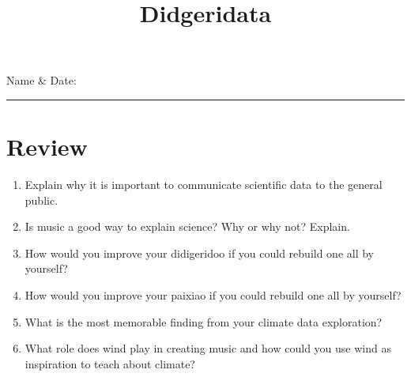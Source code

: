 \documentclass[letterpaper,12pt]{scrartcl}
\title{
Didgeridata
}\let\myTitle\@title
\begin{document}
\thispagestyle{fancy}
\noindent Name \& Date:\\ %
\rule{\textwidth}{1pt}    %

\section*{Review}
\begin{enumerate} 
	\item Explain why it is important to communicate scientific data to the general public. \vspace{30mm}
	\item Is music a good way to explain science? Why or why not? Explain. \vspace{30mm}
	\item How would you improve your didigeridoo if you could rebuild one all by yourself? \vspace{10mm}
	\item How would you improve your paixiao if you could rebuild one all by yourself? \vspace{10mm}
	\item What is the most memorable finding from your climate data exploration? \vspace{30mm}
	\item What role does wind play in creating music and how could you use wind as inspiration to teach about climate?  \vspace{30mm}
\end{enumerate}


\end{document}
